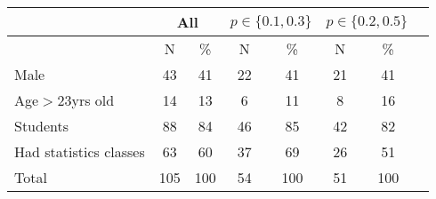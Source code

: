 \begin{tabular}{l*{7}{c}}
\hline\hline
 &  \multicolumn{2}{c}{All} & \multicolumn{2}{c}{$p\in\{0.1,0.3\}$} & \multicolumn{2}{c}{$p\in\{0.2,0.5\}$} \\
\hline
 & N & \%  & N & \%  & N & \%  \\
\hline
Male         &    43 & 41  &  22  &  41 & 21  & 41  \\

Age$>$23yrs old     &    14 & 13  &  6  & 11  &8   & 16  \\

Students     &    88 & 84  &  46  & 85  &  42 &  82 \\

Had statistics classes      &    63 & 60  & 37   & 69  & 26  &  51 \\

Total     &    105 & 100  & 54   & 100   &  51 &  100 \\

\end{tabular}

